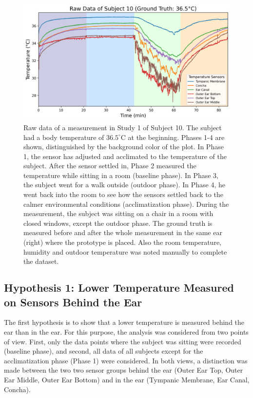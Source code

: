 \begin{figure}[!t]
    \centering
    \includegraphics[width=\textwidth]{thesis-doc/images/study1/Logging_person_10_0smoothed_raw_data.png}
    \caption{Raw data of a measurement in Study 1 of Subject 10. The subject had a body temperature of $36.5^\circ\text{C}$ at the beginning. Phases 1-4 are shown, distinguished by the background color of the plot. In Phase 1, the sensor has adjusted and acclimated to the temperature of the subject. After the sensor settled in, Phase 2 measured the temperature while sitting in a room (baseline phase). In Phase 3, the subject went for a walk outside (outdoor phase). In Phase 4, he went back into the room to see how the sensors settled back to the calmer environmental conditions (acclimatization phase). During the measurement, the subject was sitting on a chair in a room with closed windows, except the outdoor phase. The ground truth is measured before and after the whole measurement in the same ear (right) where the prototype is placed. Also the room temperature, humidity and outdoor temperature was noted manually to complete the dataset.}
    \label{fig:ch:Evaluation:Study1:RawData}
\end{figure}

\subsection{Hypothesis 1: Lower Temperature Measured on Sensors Behind the Ear}
\label{subsec:Evaluation:Study1:Hypothesis1}

The first hypothesis is to show that a lower temperature is measured behind the ear than in the ear.
For this purpose, the analysis was considered from two points of view. 
First, only the data points where the subject was sitting were recorded (baseline phase), and second, all data of all subjects except for the acclimatization phase (Phase 1) were considered.
In both views, a distinction was made between the two two sensor groups behind the ear (Outer Ear Top, Outer Ear Middle, Outer Ear Bottom) and in the ear (Tympanic Membrane, Ear Canal, Concha). 

